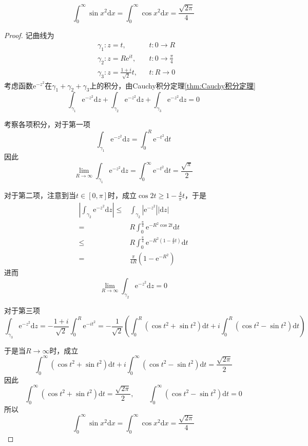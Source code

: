 \documentclass[lang = cn, scheme = chinese, thmcnt = section]{elegantbook}
\begin{document}
\begin{example}
	$$
	\int_0^{\infty}{\sin x^2\mathrm{d}x}=\int_0^{\infty}{\cos x^2\mathrm{d}x}=\frac{\sqrt{2\pi}}{4}
	$$
\end{example}

\begin{proof}
	记曲线为
	\begin{align*}
		&\gamma_1:z=t,&& t:0\to R\\
		&\gamma_2:z=R\mathrm{e}^{it},&& t:0\to\frac{\pi}{4}\\
		&\gamma_3:z=\frac{1+i}{\sqrt{2}}t,&& t:R\to0
	\end{align*}
	考虑函数$\mathrm{e}^{-z^2}$在$\gamma_1+\gamma_2+\gamma_3$上的积分，由Cauchy积分定理\ref{thm:Cauchy积分定理}
	$$
	\int_{\gamma_1}{\mathrm{e}^{-z^2}\mathrm{d}z}+\int_{\gamma_2}{\mathrm{e}^{-z^2}\mathrm{d}z}+\int_{\gamma_3}{\mathrm{e}^{-z^2}\mathrm{d}z}=0
	$$
	
	考察各项积分，对于第一项
	$$
	\int_{\gamma_1}{\mathrm{e}^{-z^2}\mathrm{d}z}=\int_0^R{\mathrm{e}^{-t^2}\mathrm{d}t}
	$$
	因此
	$$
	\lim_{R\to\infty}\int_{\gamma_1}{\mathrm{e}^{-z^2}\mathrm{d}z}=\int_0^{\infty}{\mathrm{e}^{-t^2}\mathrm{d}t}=\frac{\sqrt{\pi}}{2}
	$$
	
	对于第二项，注意到当$t\in[0,\pi]$时，成立$\cos{2t}\ge1-\frac{4}{\pi}t$，于是
	\begin{align*}
		\left|\int_{\gamma_2}{\mathrm{e}^{-z^2}\mathrm{d}z}\right|
		\le&\int_{\gamma_2}{\left|\mathrm{e}^{-z^2}\right||\mathrm{d}z|}\\
		=&R\int_0^{\frac{\pi}{4}}{\mathrm{e}^{-R^2\cos{2t}}\mathrm{d}t}\\
		\le&R\int_0^{\frac{\pi}{4}}{\mathrm{e}^{-R^2(1-\frac{4}{\pi}t)}\mathrm{d}t}\\
		=&\frac{\pi}{4R}(1-\mathrm{e}^{-R^2})
	\end{align*}
	进而
	$$
	\lim_{R\to\infty}\int_{\gamma_2}{\mathrm{e}^{-z^2}\mathrm{d}z}=0
	$$
	
	对于第三项
	$$
	\int_{\gamma_3}{\mathrm{e}^{-z^2}\mathrm{d}z}=-\frac{1+i}{\sqrt{2}}\int_0^R{\mathrm{e}^{-it^2}}=-\frac{1}{\sqrt{2}}\left( \int_0^R{(\cos{t^2}+\sin{t^2})\mathrm{d}t}+i\int_0^R{(\cos{t^2}-\sin{t^2})\mathrm{d}t} \right)
	$$
	
	于是当$R\to\infty$时，成立
	$$
	\int_0^{\infty}{(\cos{t^2}+\sin{t^2})\mathrm{d}t}+i\int_0^{\infty}{(\cos{t^2}-\sin{t^2})\mathrm{d}t}=\frac{\sqrt{2\pi}}{2}
	$$
	因此
	$$
	\int_0^{\infty}{(\cos{t^2}+\sin{t^2})\mathrm{d}t}=\frac{\sqrt{2\pi}}{2},\qquad
	\int_0^{\infty}{(\cos{t^2}-\sin{t^2})\mathrm{d}t}=0
	$$
	所以
	$$
	\int_0^{\infty}{\sin x^2\mathrm{d}x}=\int_0^{\infty}{\cos x^2\mathrm{d}x}=\frac{\sqrt{2\pi}}{4}
	$$
\end{proof}
\end{document}

